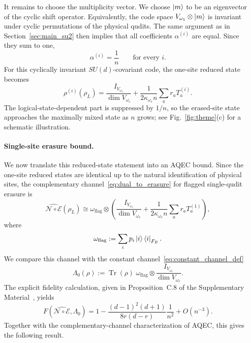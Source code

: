 \documentclass[10pt,twocolumn,superscriptaddress,aps,amsmath,amssymb,citeautoscript,floatfix,prx]{revtex4-2}
\theoremstyle{plain}
\theoremstyle{plain}
\theoremstyle{plain}
\theoremstyle{plain}
\theoremstyle{plain}
\theoremstyle{plain}
\begin{document}
It remains to choose the multiplicity vector. We choose $\ket m$ to be an eigenvector of the cyclic shift operator. Equivalently, the code space $V_{\omega_1}\otimes\ket m$ is invariant under cyclic permutations of the physical qudits. The same argument as in Section~\ref{sec:main_su2} then implies that all coefficients $\alpha^{(i)}$ are equal. Since they sum to one,
$$
\alpha^{(i)}=\frac1n
\qquad
\text{for every } i .
$$
For this cyclically invariant $SU(d)$-covariant code, the one-site reduced state becomes
$$
\rho^{(i)}(\rho_L)
=
\frac{I_{V_{\omega_r}}}{\dim V_{\omega_r}}
+
\frac{1}{2\kappa_{\omega_r}n}
\sum_a r_a T_a^{(i)} .
$$
The logical-state-dependent part is suppressed by $1/n$, so the erased-site state approaches the maximally mixed state as $n$ grows; see Fig.~\ref{fig:theme}(c) for a schematic illustration.

\paragraph{Single-site erasure bound.}

We now translate this reduced-state statement into an AQEC bound. Since the one-site reduced states are identical up to the natural identification of physical sites, the complementary channel~\eqref{eq:dual_to_erasure} for flagged single-qudit erasure is
$$
\widehat{\mathcal N\circ\mathcal E}(\rho_L)
\cong
\omega_{\mathrm{flag}}
\otimes
\left(
\frac{I_{V_{\omega_r}}}{\dim V_{\omega_r}}
+
\frac{1}{2\kappa_{\omega_r}n}
\sum_a r_a T_a^{(1)}
\right),
$$
where
$$
\omega_{\mathrm{flag}}
:=
\sum_i p_i\ket i\bra i_{F_E}.
$$
We compare this channel with the constant channel~\eqref{eq:constant_channel_def}
$$
\Lambda_0(\rho)
:=
\operatorname{Tr}(\rho)\;
\omega_{\mathrm{flag}}
\otimes
\frac{I_{V_{\omega_r}}}{\dim V_{\omega_r}} .
$$
The explicit fidelity calculation, given in Proposition~C.8 of the Supplementary Material~\cite{SuppMat}, yields
\begin{equation}\label{eq:fidelity_sud}
F\left(\widehat{\mathcal N\circ\mathcal E},\Lambda_0\right)
=
1
-
\frac{(d-1)^2(d+1)}{8r(d-r)}
\frac{1}{n^2}
+
O(n^{-3}) .
\end{equation}
Together with the complementary-channel characterization of AQEC, this gives the following result.
\end{document}
